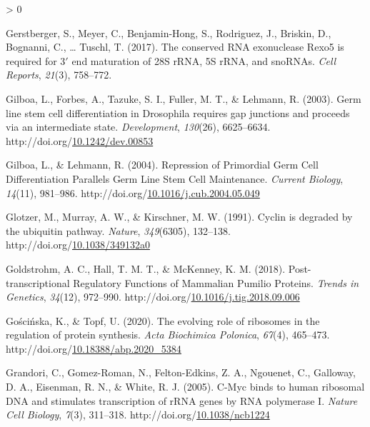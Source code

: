 \documentclass[12pt,oneside]{reedthesis}
\newlength{\cslhangindent}
\newenvironment{CSLReferences}[2] %
 {%
  \setlength{\parindent}{0pt}
  \ifodd #1 \everypar{\setlength{\hangindent}{\cslhangindent}}\ignorespaces\fi
  \ifnum #2 > 0
  \setlength{\parskip}{#2\baselineskip}
  \fi
 }%
 {}
\begin{document}
\begin{CSLReferences}{1}{0}
\leavevmode\hypertarget{ref-Gerstberger2017}{}%
Gerstberger, S., Meyer, C., Benjamin-Hong, S., Rodriguez, J., Briskin, D., Bognanni, C., \ldots{} Tuschl, T. (2017). The conserved {RNA} exonuclease {Rexo5} is required for 3{\({'}\)} end maturation of {28S rRNA}, {5S rRNA}, and {snoRNAs}. \emph{Cell Reports}, \emph{21}(3), 758--772.

\leavevmode\hypertarget{ref-gilboaGermLineStem2003}{}%
Gilboa, L., Forbes, A., Tazuke, S. I., Fuller, M. T., \& Lehmann, R. (2003). Germ line stem cell differentiation in {Drosophila} requires gap junctions and proceeds via an intermediate state. \emph{Development}, \emph{130}(26), 6625--6634. http://doi.org/\href{https://doi.org/10.1242/dev.00853}{10.1242/dev.00853}

\leavevmode\hypertarget{ref-Gilboa2004a}{}%
Gilboa, L., \& Lehmann, R. (2004). Repression of {Primordial Germ Cell Differentiation Parallels Germ Line Stem Cell Maintenance}. \emph{Current Biology}, \emph{14}(11), 981--986. http://doi.org/\href{https://doi.org/10.1016/j.cub.2004.05.049}{10.1016/j.cub.2004.05.049}

\leavevmode\hypertarget{ref-glotzerCyclinDegradedUbiquitin1991}{}%
Glotzer, M., Murray, A. W., \& Kirschner, M. W. (1991). Cyclin is degraded by the ubiquitin pathway. \emph{Nature}, \emph{349}(6305), 132--138. http://doi.org/\href{https://doi.org/10.1038/349132a0}{10.1038/349132a0}

\leavevmode\hypertarget{ref-Goldstrohm2018c}{}%
Goldstrohm, A. C., Hall, T. M. T., \& McKenney, K. M. (2018). Post-transcriptional {Regulatory Functions} of {Mammalian Pumilio Proteins}. \emph{Trends in Genetics}, \emph{34}(12), 972--990. http://doi.org/\href{https://doi.org/10.1016/j.tig.2018.09.006}{10.1016/j.tig.2018.09.006}

\leavevmode\hypertarget{ref-goscinskaEvolvingRoleRibosomes2020}{}%
Gościńska, K., \& Topf, U. (2020). The evolving role of ribosomes in the regulation of protein synthesis. \emph{Acta Biochimica Polonica}, \emph{67}(4), 465--473. http://doi.org/\href{https://doi.org/10.18388/abp.2020_5384}{10.18388/abp.2020\_5384}

\leavevmode\hypertarget{ref-grandoriCMycBindsHuman2005}{}%
Grandori, C., Gomez-Roman, N., Felton-Edkins, Z. A., Ngouenet, C., Galloway, D. A., Eisenman, R. N., \& White, R. J. (2005). C-{Myc} binds to human ribosomal {DNA} and stimulates transcription of {rRNA} genes by {RNA} polymerase {I}. \emph{Nature Cell Biology}, \emph{7}(3), 311--318. http://doi.org/\href{https://doi.org/10.1038/ncb1224}{10.1038/ncb1224}


\end{CSLReferences}
\end{document}
